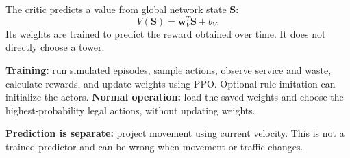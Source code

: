 \documentclass[10pt,a4paper]{article}
\begin{document}
The critic predicts a value from global network state $\mathbf S$:
\begin{equation}
V(\mathbf S)=\mathbf w_V^T\mathbf S+b_V.
\end{equation}
Its weights are trained to predict the reward obtained over time. It does not directly choose a tower.

\textbf{Training:} run simulated episodes, sample actions, observe service and waste, calculate rewards, and update weights using PPO. Optional rule imitation can initialize the actors. \textbf{Normal operation:} load the saved weights and choose the highest-probability legal actions, without updating weights.

\textbf{Prediction is separate:} project movement using current velocity. This is not a trained predictor and can be wrong when movement or traffic changes.

\newpage
\end{document}
